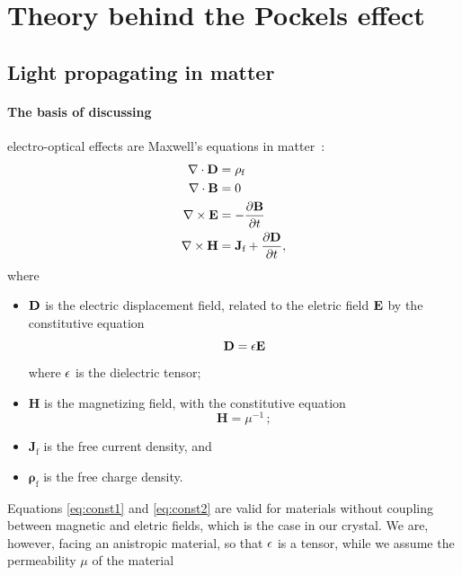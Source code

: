 \section{Theory behind the Pockels effect}

\subsection{Light propagating in matter}
\paragraph{The basis of discussing} 
electro-optical effects are 
Maxwell's equations in matter~\cite{boyd2003nonlinear}:
\begin{subequations} 
\begin{align}
\nabla \cdot \mathbf{D} &= \rho_\text{f} 
\label{eq:max1} \\ 
\nabla \cdot \mathbf{B} &= 0
\label{eq:max2} \\ 
\nabla \times \mathbf{E} &= -\frac{\partial \mathbf{B}} {\partial t}
\label{eq:max3} \\ 
    \nabla \times \mathbf{H} &= \mathbf{J}_\text{f} + 
        \frac{\partial \mathbf{D}} {\partial t}, 
\label{eq:max4}
\end{align}
\label{eq:maxwell}
\end{subequations}
where 
\begin{itemize}
    \item $\mathbf{D}$ is the electric displacement field, related to the eletric field $\mathbf{E}$ 
    by the constitutive equation 
    \begin{equation}
        \mathbf{D} = \mathbf{\epsilon} \mathbf{E} 
    \label{eq:const1}
    \end{equation}
    where $\mathbf{\epsilon}$ is the dielectric tensor;
    \item $\mathbf{H}$ is the magnetizing field, with the constitutive equation 
    \begin{equation}
        \mathbf{H} = \mu^{-1} \, ;
    \label{eq:const2}
    \end{equation}
    \item $\mathbf{J}_\text{f}$ is the free current density, and
    \item $\mathbf{\rho}_\text{f}$ is the free charge density.
\end{itemize}
Equations \eqref{eq:const1} and \eqref{eq:const2} are valid for materials without 
coupling between magnetic and eletric fields, which is the case in our 
crystal. We are, however, facing an anistropic material, so that 
$\mathbf{\epsilon}$ is a tensor, while we assume the permeability $\mu$ of the material 
